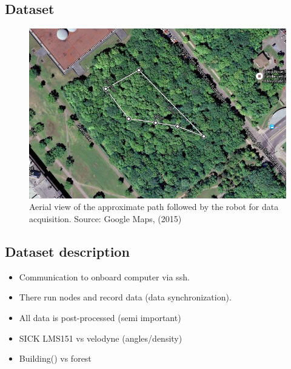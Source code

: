 \subsection{Dataset}
\begin{figure}[htpb]
    \centering
    \includegraphics[width=0.95\linewidth]{img/chap_slam/path.png}
    \caption{Aerial view of the approximate path followed by the robot for data acquisition. Source: Google Maps, (2015)}
    \label{fig:chap_slam_path}
\end{figure}


\subsection{Dataset description}
\label{ssec:chap_slam_platform}

\begin{itemize}
    \item Communication to onboard computer via ssh.
    \item There run nodes and record data (data synchronization).
    \item All data is post-processed (semi important)
    \item SICK LMS151 vs velodyne (angles/density)
    \item Building() vs forest
\end{itemize}
